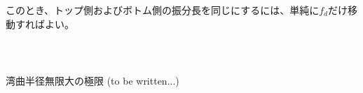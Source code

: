 このとき、トップ側およびボトム側の振分長を同じにするには、単純に$f_d$だけ移動すればよい。

~\vfill
\begin{Column}{湾曲半径無限大の極限\TBW}
(to be written...)
\end{Column}
